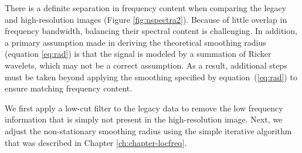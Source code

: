     There is a definite separation in frequency content when comparing the legacy and high-resolution images (Figure \ref{fig:nspectra2}). 
    Because of little overlap in frequency bandwidth, balancing their spectral content is challenging. 
    In addition, a primary assumption made in deriving the theoretical smoothing radius (equation \ref{eq:rad}) is that the signal is modeled by a summation of Ricker wavelets, which may not be a correct assumption. 
    As a result, additional steps must be taken beyond applying the smoothing specified by equation~(\ref{eq:rad}) to ensure matching frequency content. 
    
    
    We first apply a low-cut filter to the legacy data to remove the low frequency information that is simply not present in the high-resolution image. 
    Next, we adjust the non-stationary smoothing radius using the simple iterative algorithm \cite[]{locfreq} that was described in Chapter \ref{ch:chapter-locfreq}. 
    
